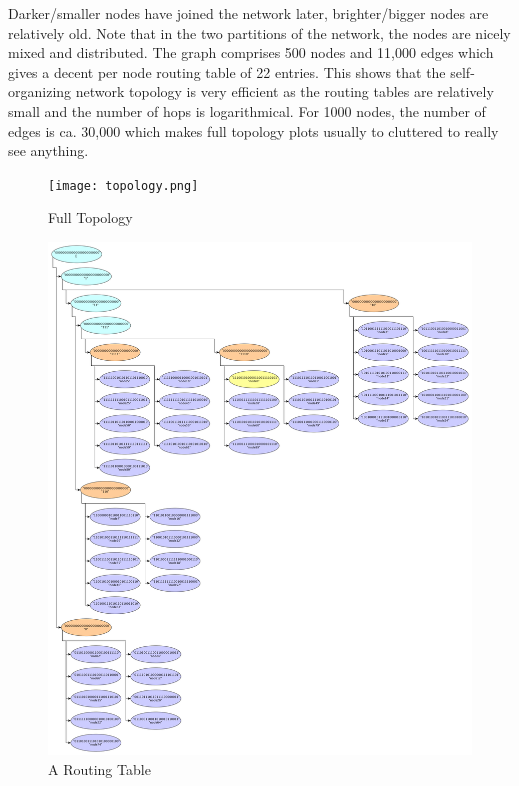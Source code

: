 \documentclass[a4paper,10pt,notitlepage]{article}
\begin{document}
Darker/smaller nodes have joined the network later, brighter/bigger nodes are relatively old.
Note that in the two partitions of the network, the nodes are nicely mixed and distributed.
The graph comprises 500 nodes and 11,000 edges which gives a decent per node routing table of 22 entries.
This shows that the self-organizing network topology is very efficient as the routing tables are relatively small and the number of hops is logarithmical.
For 1000 nodes, the number of edges is ca. 30,000 which makes full topology plots usually to cluttered to really see anything.
\begin{figure}[htbp]
   \texttt{[image: topology.png]}
   \caption{Full Topology}
\end{figure}

\begin{figure}[htbp]
   \includegraphics[width=15cm]{routingtable.png}
   \caption{A Routing Table}
\end{figure}

\pagebreak
\end{document}
